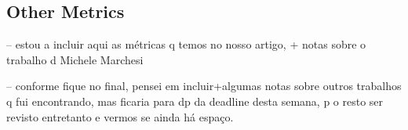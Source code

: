 \subsection{Other Metrics}

-- estou a incluir aqui as métricas q temos no nosso artigo, + notas sobre o trabalho d Michele Marchesi

-- conforme fique no final, pensei em incluir+algumas notas sobre outros trabalhos q fui encontrando, mas ficaria para dp da deadline desta semana, p o resto ser revisto entretanto e vermos se ainda há espaço.

